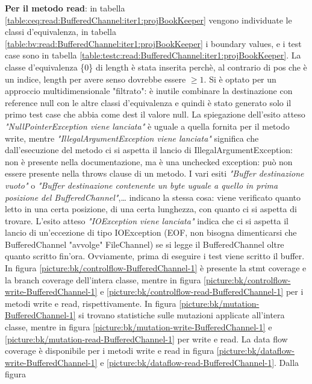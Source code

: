 \documentclass[10pt, a4paper]{article}
\newcommand{\gettablelabel}[5]{table:#1:#2:#3:iter#4:proj#5}
\newcommand{\getpicturelabel}[1]{picture:#1}
\def\bookkeeper{BookKeeper}
\newcommand{\ceq}[1]{\{#1\}}
\begin{document}
	\textbf{Per il metodo read}: in tabella \ref{\gettablelabel{ceq}{read}{BufferedChannel}{1}{\bookkeeper}}
	vengono individuate le classi d'equivalenza, in tabella 
	\ref{\gettablelabel{bv}{read}{BufferedChannel}{1}{\bookkeeper}} 
	i boundary values, e i test case sono in tabella 
	\ref{\gettablelabel{testc}{read}{BufferedChannel}{1}{\bookkeeper}}.
	La classe d'equivalenza \ceq{0} di length è stata inserita perchè, al contrario di pos che è un indice, 
	length per avere senso dovrebbe essere $\ge 1$.
	Si è optato per un approccio multidimensionale "filtrato": è inutile combinare la destinazione con reference
	null con le altre classi d'equivalenza e quindi è stato generato solo il primo test case che abbia come
	dest il valore null.
	La spiegazione dell'esito atteso \textit{"NullPointerException viene lanciata"} è uguale a quella fornita
	per il metodo write, mentre \textit{"IllegalArgumentException viene lanciata"} significa che dall'esecuzione
	del metodo ci si aspetta il lancio di IllegalArgumentException: non è presente nella documentazione, ma è
	una unchecked exception: può non essere presente nella throws clause di un metodo.
	I vari esiti \textit{"Buffer destinazione vuoto"} o 
	\textit{"Buffer destinazione contenente un byte uguale a quello in prima posizione del BufferedChannel"},\dots
	indicano la stessa cosa: 
	viene verificato quanto letto in una certa posizione, di una certa lunghezza, 
	con quanto ci si aspetta di trovare. 
	L'esito atteso \textit{"IOException viene lanciata"} indica che ci si aspetta il lancio di un'eccezione di tipo 
	IOException (EOF, non bisogna dimenticarsi che BufferedChannel "avvolge" FileChannel) 
	se si legge il BufferedChannel oltre quanto scritto fin'ora. 
	Ovviamente, prima di eseguire i test viene scritto il buffer.
	In figura \ref{\getpicturelabel{bk/controlflow-BufferedChannel-1}} è presente la stmt coverage e la branch
	coverage dell'intera classe, mentre in figura \ref{\getpicturelabel{bk/controlflow-write-BufferedChannel-1}} e 
	\ref{\getpicturelabel{bk/controlflow-read-BufferedChannel-1}} per i metodi write e read, rispettivamente.
	In figura \ref{\getpicturelabel{bk/mutation-BufferedChannel-1}} si trovano statistiche sulle mutazioni
	applicate all'intera classe, mentre in figura \ref{\getpicturelabel{bk/mutation-write-BufferedChannel-1}} e 
	\ref{\getpicturelabel{bk/mutation-read-BufferedChannel-1}} per write e read.
	La data flow coverage è disponibile per i metodi write e read in figura 
	\ref{\getpicturelabel{bk/dataflow-write-BufferedChannel-1}} e 
	\ref{\getpicturelabel{bk/dataflow-read-BufferedChannel-1}}. Dalla figura 
\end{document}
